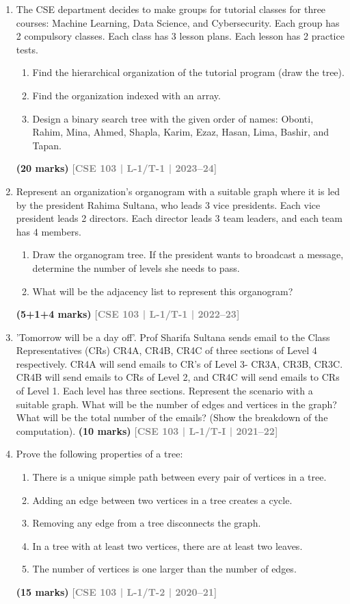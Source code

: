 \documentclass[12pt,a3paper]{article}
\newcommand{\yr}[1]{\hfill\textcolor{gray}{\small\textbf{[#1]}}}
\newcommand{\mk}[1]{\textcolor{orange!70!black}{\small\textbf{(#1 marks)}}}
\begin{document}
\begin{enumerate}
\item The CSE department decides to make groups for tutorial classes for three courses: Machine Learning, Data Science, and Cybersecurity. Each group has 2 compulsory classes. Each class has 3 lesson plans. Each lesson has 2 practice tests.
\begin{enumerate}
  \item Find the hierarchical organization of the tutorial program (draw the tree).
  \item Find the organization indexed with an array.
  \item Design a binary search tree with the given order of names: Obonti, Rahim, Mina, Ahmed, Shapla, Karim, Ezaz, Hasan, Lima, Bashir, and Tapan.
\end{enumerate}
\mk{20} \yr{CSE 103 | L-1/T-1 | 2023--24}
\item Represent an organization's organogram with a suitable graph where it is led by the president Rahima Sultana, who leads 3 vice presidents. Each vice president leads 2 directors. Each director leads 3 team leaders, and each team has 4 members.
\begin{enumerate}
  \item Draw the organogram tree. If the president wants to broadcast a message, determine the number of levels she needs to pass.
  \item What will be the adjacency list to represent this organogram?
\end{enumerate}
\mk{5+1+4} \yr{CSE 103 | L-1/T-1 | 2022--23}

\item 'Tomorrow will be a day off'. Prof Sharifa Sultana sends email to the Class Representatives (CRs) CR4A, CR4B, CR4C of three sections of Level 4 respectively. CR4A will send emails to CR's of Level 3- CR3A, CR3B, CR3C. CR4B will send emails to CRs of Level 2, and CR4C will send emails to CRs of Level 1. Each level has three sections. Represent the scenario with a suitable graph. What will be the number of edges and vertices in the graph? What will be the total number of the emails? (Show the breakdown of the computation).
\mk{10} \yr{CSE 103 | L-1/T-I | 2021--22}

\item Prove the following properties of a tree:
\begin{enumerate}
  \item There is a unique simple path between every pair of vertices in a tree.
  \item Adding an edge between two vertices in a tree creates a cycle.
  \item Removing any edge from a tree disconnects the graph.
  \item In a tree with at least two vertices, there are at least two leaves.
  \item The number of vertices is one larger than the number of edges.
\end{enumerate}
\mk{15} \yr{CSE 103 | L-1/T-2 | 2020--21}


\end{enumerate}
\end{document}
